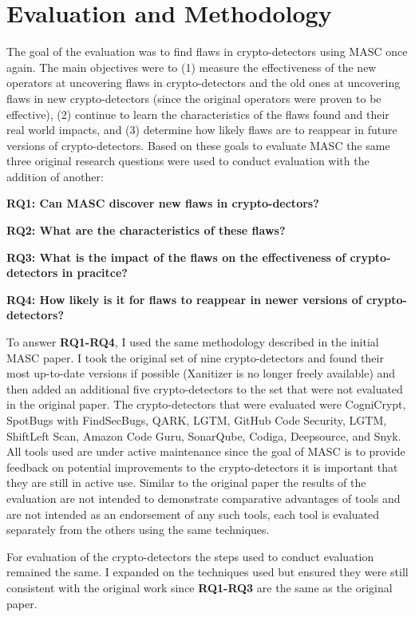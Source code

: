 \chapter{Evaluation and Methodology}
\label{chap_evaluation}

The goal of the evaluation was to find flaws in crypto-detectors using MASC once again. The main objectives were to (1) measure the effectiveness of the new operators at uncovering flaws in crypto-detectors and the old ones at uncovering flaws in new crypto-detectors (since the original operators were proven to be effective), (2) continue to learn the characteristics of the flaws found and their real world impacts, and (3) determine how likely flaws are to reappear in future versions of crypto-detectors. Based on these goals to evaluate MASC the same three original research questions were used to conduct evaluation with the addition of another:

\textbf{RQ1: Can MASC discover new flaws in crypto-dectors?}

\textbf{RQ2: What are the characteristics of these flaws?}

\textbf{RQ3: What is the impact of the flaws on the effectiveness of crypto-detectors in pracitce?}

\textbf{RQ4: How likely is it for flaws to reappear in newer versions of crypto-detectors?}

To answer \textbf{RQ1-RQ4}, I used the same methodology described in the initial MASC paper. I took the original set of nine crypto-detectors and found their most up-to-date versions if possible (Xanitizer is no longer freely available) and then added an additional five crypto-detectors to the set that were not evaluated in the original paper. The crypto-detectors that were evaluated were CogniCrypt, SpotBugs with FindSecBugs, QARK, LGTM, GitHub Code Security, LGTM, ShiftLeft Scan, Amazon Code Guru, SonarQube, Codiga, Deepsource, and Snyk. All tools used are under active maintenance since the goal of MASC is to provide feedback on potential improvements to the crypto-detectors it is important that they are still in active use. Similar to the original paper the results of the evaluation are not intended to demonstrate comparative advantages of tools and are not intended as an endorsement of any such tools, each tool is evaluated separately from the others using the same techniques.

For evaluation of the crypto-detectors the steps used to conduct evaluation remained the same. I expanded on the techniques used but ensured they were still consistent with the original work since \textbf{RQ1-RQ3} are the same as the original paper.

